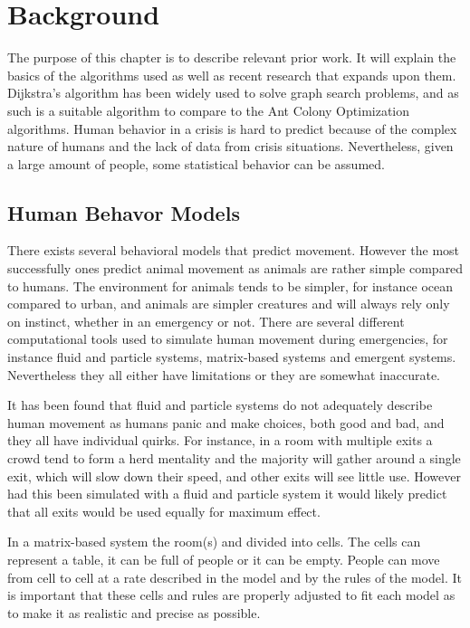\chapter{Background}
\label{ch:background}

The purpose of this chapter is to describe relevant prior work. It will explain the basics of the algorithms
used as well as recent research that expands upon them. Dijkstra's algorithm has been widely used to solve
graph search problems, and as such is a suitable algorithm to compare to the Ant Colony Optimization algorithms.
Human behavior in a crisis is hard to predict because of the complex nature of humans and the lack of data from 
crisis situations. Nevertheless, given a large amount of people, some statistical behavior can be assumed.

\section{Human Behavor Models}
There exists several behavioral models that predict movement. However the most successfully ones predict 
animal movement as animals are rather simple compared to humans. The environment for animals tends to 
be simpler, for instance ocean compared to urban, and animals are simpler creatures and will always rely only 
on instinct, whether in an emergency or not. There are several different computational tools used to simulate  
human movement during emergencies, for instance fluid and particle systems, matrix-based systems and  
emergent systems. Nevertheless they all either have limitations or they are somewhat inaccurate. 
 
It has been found that fluid and particle systems do not adequately describe human movement as humans  
panic and make choices, both good and bad, and they all have individual quirks. For instance, in a room with  
multiple exits a crowd tend to form a herd mentality and the majority will gather around a single exit, which  
will slow down their speed, and other exits will see little use. However had this been simulated with a fluid  
and particle system it would likely predict that all exits would be used equally for maximum effect. 
 
In a matrix-based system the room(s) and divided into cells. The cells can represent a table, it can be full of  
people or it can be empty. People can move from cell to cell at a rate described in the model and by the  
rules of the model. It is important that these cells and rules are properly adjusted to fit each model as to  
make it as realistic and precise as possible. 
 
